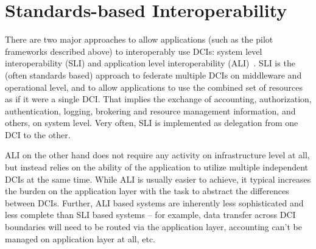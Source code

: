 \documentclass[]{paper}
\newcommand{\jhanote}[1]{ {\textcolor{red} { ***shantenu: #1 }}}
\newcommand{\alnote}[1]{ {\textcolor{green} { ***andreL: #1 }}}
\newcommand{\alnote}[1]{}
\newcommand{\jhanote}[1]{}
\begin{document}
% 
% 

\section{Standards-based Interoperability}
\label{sec:standards}

 There are two major approaches to allow applications (such as the
 pilot frameworks described above) to interoperably use DCIs: system
 level interoperability (SLI) and application level interoperability
 (ALI)~\cite{fgcs-interop11}.  SLI is the (often standards based)
 approach to federate multiple DCIs on middleware and operational
 level, and to allow applications to use the combined set of resources
 as if it were a single DCI.  That implies the exchange of accounting,
 authorization, authentication, logging, brokering and resource
 management information, and others, on system level.  Very often, SLI
 is implemented as delegation from one DCI to the other.

 ALI on the other hand does not require any activity on infrastructure
 level at all, but instead relies on the ability of the application to
 utilize multiple independent DCIs at the same time.  While ALI is
 usually easier to achieve, it typical increases the burden on the
 application layer with the task to abstract the differences between
 DCIs.  Further, ALI based systems are inherently less sophisticated
 and less complete than SLI based systems -- for example, data
 transfer across DCI boundaries will need to be routed via the
 application layer, accounting can't be managed on application layer
 at all, etc. 
\end{document}
